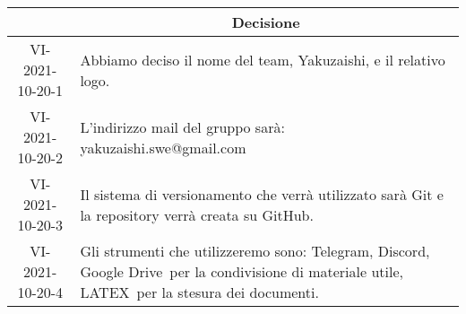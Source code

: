 \begin{table}[H]
	\centering
	\renewcommand{\arraystretch}{1.8}
	\begin{tabular}{c | p{8cm}}
		\rowcolor[HTML]{125e28}
		\multicolumn{1}{c}{\color[HTML]{FFFFFF} \textbf{ID}} &
		\multicolumn{1}{c}{\color[HTML]{FFFFFF} \textbf{Decisione}} \\
		\hline
		VI-2021-10-20-1 & Abbiamo deciso il nome del team, Yakuzaishi, e il relativo logo.  \\ \hline
		VI-2021-10-20-2 & L'indirizzo mail del gruppo sarà: yakuzaishi.swe@gmail.com \\ \hline
		VI-2021-10-20-3 & Il sistema di versionamento che verrà utilizzato sarà Git\glo{} e la repository\glo{} verrà creata su GitHub\glo.  \\ \hline
		VI-2021-10-20-4 & Gli strumenti che utilizzeremo sono: Telegram\glo, Discord\glo, Google Drive\glo\ per la condivisione di materiale utile, LATEX\glo\ per la stesura dei documenti.  \\
	\end{tabular}
\end{table}